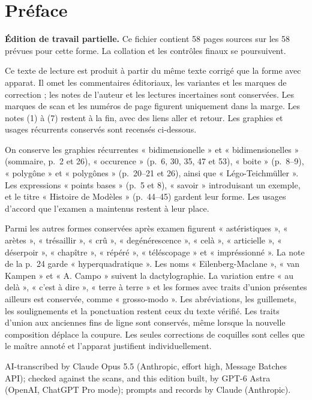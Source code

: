 \documentclass[11pt,a4paper]{article}
\begin{document}
\section*{Préface}
\noindent\textbf{Édition de travail partielle.} Ce fichier contient 58 pages sources sur les 58 prévues pour cette forme. La collation et les contrôles finaux se poursuivent.\par\smallskip
Ce texte de lecture est produit à partir du même texte corrigé que la forme avec apparat. Il omet les commentaires éditoriaux, les variantes et les marques de correction ; les notes de l’auteur et les lectures incertaines sont conservées. Les marques de scan et les numéros de page figurent uniquement dans la marge. Les notes (1) à (7) restent à la fin, avec des liens aller et retour. Les graphies et usages récurrents conservés sont recensés ci-dessous. \par\smallskip
On conserve les graphies récurrentes « bidimensionelle » et
« bidimensionelles » (sommaire, p.~2 et 26), « occurence » (p.~6, 30, 35,
47 et 53), « boite » (p.~8--9), « polygône » et « polygônes » (p.~20--21
et 26), ainsi que « Légo-Teichmüller ». Les expressions « points bases »
(p.~5 et 8), « savoir » introduisant un exemple, et le titre « Histoire
de Modèles » (p.~44--45) gardent leur forme. Les usages d'accord que
l'examen a maintenus restent à leur place.
\par
Parmi les autres formes conservées après examen figurent « astéristiques »,
« arètes », « trésaillir », « crû », « degénérescence », « celà »,
« articielle », « déserpoir », « chapître », « répéré », « téléscopage »
et « impréssionné ». La note de la p.~24 garde « hyperquadratique ».
Les noms « Eilenberg-Maclane », « van Kampen » et « A. Campo » suivent
la dactylographie. La variation entre « au delà », « c'est à dire »,
« terre à terre » et les formes avec traits d'union présentes ailleurs
est conservée, comme « grosso-modo ». Les abréviations, les guillemets,
les soulignements et la ponctuation restent ceux du texte vérifié.
Les traits d'union aux anciennes fins de ligne sont conservés, même
lorsque la nouvelle composition déplace la coupure. Les seules
corrections de coquilles sont celles que le maître annoté et l'apparat
justifient individuellement.


\smallskip
AI-transcribed by Claude Opus 5.5 (Anthropic, effort high, Message Batches API); checked against the scans, and this edition built, by GPT-6 Astra (OpenAI, ChatGPT Pro mode); prompts and records by Claude (Anthropic).
\end{document}
